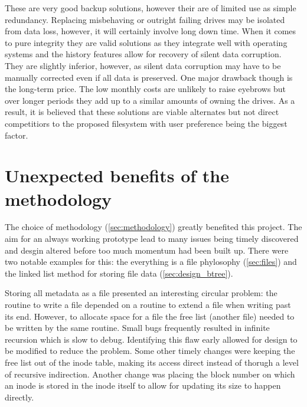         These are very good backup solutions, however their are of limited use
        as simple redundancy. Replacing misbehaving or outright failing drives
        may be isolated from data loss, however, it will certainly involve long
        down time. When it comes to pure integrity they are valid solutions as
        they integrate well with operating systems and the history features
        allow for recovery of silent data corruption. They are slightly
        inferior, however, as silent data corruption may have to be manually
        corrected even if all data is preserved. One major drawback though is
        the long-term price. The low monthly costs are unlikely to raise
        eyebrows but over longer periods they add up to a similar amounts of
        owning the drives. As a result, it is believed that these solutions are
        viable alternates but not direct competitiors to the proposed
        filesystem with user preference being the biggest factor.


    \section{Unexpected benefits of the methodology}

        The choice of methodology (\autoref{sec:methodology}) greatly benefited
        this project. The aim for an always working prototype lead to many
        issues being timely discovered and desgin altered before too much
        momentum had been built up. There were two notable examples for this:
        the everything is a file phylosophy (\autoref{sec:files}) and the linked
        list method for storing file data (\autoref{sec:design_btree}).

        Storing all metadata as a file presented an interesting circular
        problem: the routine to write a file depended on a routine to extend a
        file when writing past its end. However, to allocate space for a file
        the free list (another file) needed to be written by the same routine.
        Small bugs frequently resulted in infinite recursion which is slow to
        debug. Identifying this flaw early allowed for design to be modified to
        reduce the problem. Some other timely changes were keeping the free
        list out of the inode table, making its access direct instead of
        thorugh a level of recursive indirection. Another change was placing
        the block number on which an inode is stored in the inode itself to
        allow for updating its size to happen directly.

